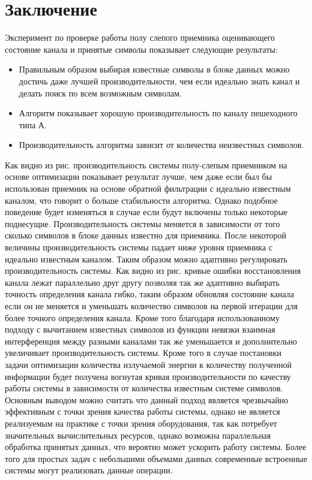 \section{Заключение}
Эксперимент по проверке работы полу слепого приемника оценивающего состояние канала и принятые символы показывает следующие результаты:
\begin{itemize}
\item Правильным образом выбирая известные символы в блоке данных можно достичь даже лучшей производительности, чем если идеально знать канал и делать поиск по всем возможным символам.
\item Алгоритм показывает хорошую производительность по каналу пешеходного типа А. 
\item Производительность алгоритма зависит от количества неизвестных символов.
\end{itemize}
Как видно из рис. производительность системы  полу-слепым приемником на основе оптимизации показывает результат лучше, чем даже если был бы использован приемник на основе обратной фильтрации с идеально известным каналом, что говорит о больше стабильности алгоритма. Однако подобное поведение будет изменяться в случае если будут включены только некоторые поднесущие. Производительность системы меняется в зависимости от того сколько символов в блоке данных известно для приемника. После некоторой величины производительность системы падает ниже уровня приемника с идеально известным каналом. Таким образом можно адаптивно регулировать производительность системы. Как видно из рис. кривые ошибки восстановления канала лежат параллельно друг другу позволяя так же адаптивно выбирать точность определения канала гибко, таким образом обновляя состояние канала если он не меняется и уменьшать количество символов на первой итерации для более точного определения канала. Кроме того благодаря использованному подходу с вычитанием известных символов из функции невязки взаимная интерференция между разными каналами так же уменьшается и дополнительно увеличивает производительность системы. Кроме того в случае постановки задачи оптимизации количества излучаемой энергии к количеству полученной информации будет получена вогнутая кривая производительности по качеству работы системы в зависимости от количества известным системе символов.
Основным выводом можно считать что данный подход является чрезвычайно эффективным с точки зрения качества работы системы, однако не является реализуемым на практике с точки зрения оборудования, так как потребует значительных вычислительных ресурсов, однако возможна параллельная обработка принятых данных, что вероятно может ускорить работу системы. Более того для простых задач с небольшими объемами данных современные встроенные системы могут реализовать данные операции.
\clearpage